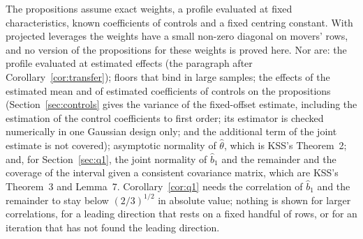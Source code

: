 The propositions assume exact weights, a profile evaluated at fixed characteristics, known coefficients of
controls and a fixed centring constant. With projected leverages the weights have a small non-zero diagonal on
movers' rows, and no version of the propositions for these weights is proved here. Nor are: the profile evaluated
at estimated effects (the paragraph after Corollary~\ref{cor:transfer}); floors that bind in large samples; the
effects of the estimated mean and of estimated coefficients of controls on the propositions (Section~\ref{sec:controls}
gives the variance of the fixed-offset estimate, including the estimation of the control coefficients to first
order; its estimator is checked numerically in one Gaussian design only; and the additional term of the joint
estimate is not covered);
asymptotic normality of
$\hat\theta$, which is KSS's Theorem~2; and, for Section~\ref{sec:q1}, the joint normality of $\hat b_1$ and the
remainder and the coverage of the interval given a consistent covariance matrix, which are KSS's Theorem~3 and
Lemma~7. Corollary~\ref{cor:q1} needs the correlation of $\hat b_1$ and the remainder to stay below
$(2/3)^{1/2}$ in absolute value; nothing is shown for larger correlations, for a leading direction that rests on
a fixed handful of rows, or for an iteration that has not found the leading direction.
